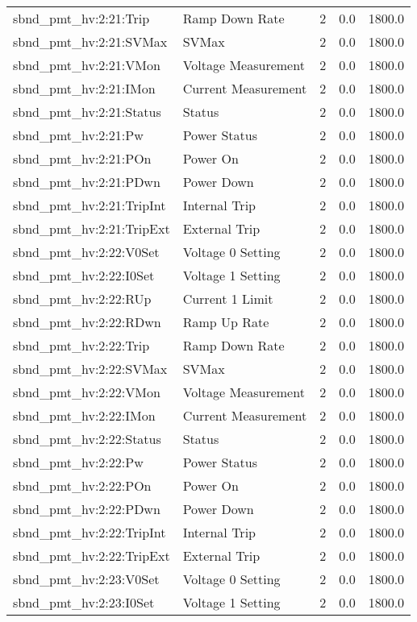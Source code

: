 \begin{center}
\begin{longtable}{l | l l l l }
sbnd\_pmt\_hv:2:21:Trip & Ramp Down Rate & 2 & 0.0 & 1800.0\\ 
sbnd\_pmt\_hv:2:21:SVMax & SVMax & 2 & 0.0 & 1800.0\\ 
sbnd\_pmt\_hv:2:21:VMon & Voltage Measurement & 2 & 0.0 & 1800.0\\ 
sbnd\_pmt\_hv:2:21:IMon & Current Measurement & 2 & 0.0 & 1800.0\\ 
sbnd\_pmt\_hv:2:21:Status & Status & 2 & 0.0 & 1800.0\\ 
sbnd\_pmt\_hv:2:21:Pw & Power Status & 2 & 0.0 & 1800.0\\ 
sbnd\_pmt\_hv:2:21:POn & Power On & 2 & 0.0 & 1800.0\\ 
sbnd\_pmt\_hv:2:21:PDwn & Power Down & 2 & 0.0 & 1800.0\\ 
sbnd\_pmt\_hv:2:21:TripInt & Internal Trip & 2 & 0.0 & 1800.0\\ 
sbnd\_pmt\_hv:2:21:TripExt & External Trip & 2 & 0.0 & 1800.0\\ 
sbnd\_pmt\_hv:2:22:V0Set & Voltage 0 Setting & 2 & 0.0 & 1800.0\\ 
sbnd\_pmt\_hv:2:22:I0Set & Voltage 1 Setting & 2 & 0.0 & 1800.0\\ 
sbnd\_pmt\_hv:2:22:RUp & Current 1 Limit & 2 & 0.0 & 1800.0\\ 
sbnd\_pmt\_hv:2:22:RDwn & Ramp Up Rate & 2 & 0.0 & 1800.0\\ 
sbnd\_pmt\_hv:2:22:Trip & Ramp Down Rate & 2 & 0.0 & 1800.0\\ 
sbnd\_pmt\_hv:2:22:SVMax & SVMax & 2 & 0.0 & 1800.0\\ 
sbnd\_pmt\_hv:2:22:VMon & Voltage Measurement & 2 & 0.0 & 1800.0\\ 
sbnd\_pmt\_hv:2:22:IMon & Current Measurement & 2 & 0.0 & 1800.0\\ 
sbnd\_pmt\_hv:2:22:Status & Status & 2 & 0.0 & 1800.0\\ 
sbnd\_pmt\_hv:2:22:Pw & Power Status & 2 & 0.0 & 1800.0\\ 
sbnd\_pmt\_hv:2:22:POn & Power On & 2 & 0.0 & 1800.0\\ 
sbnd\_pmt\_hv:2:22:PDwn & Power Down & 2 & 0.0 & 1800.0\\ 
sbnd\_pmt\_hv:2:22:TripInt & Internal Trip & 2 & 0.0 & 1800.0\\ 
sbnd\_pmt\_hv:2:22:TripExt & External Trip & 2 & 0.0 & 1800.0\\ 
sbnd\_pmt\_hv:2:23:V0Set & Voltage 0 Setting & 2 & 0.0 & 1800.0\\ 
sbnd\_pmt\_hv:2:23:I0Set & Voltage 1 Setting & 2 & 0.0 & 1800.0\\ 

\end{longtable}
\end{center}
